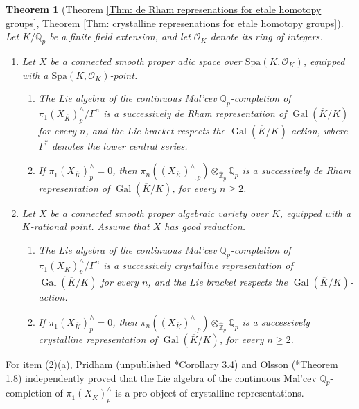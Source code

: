 \documentclass[11pt]{amsart}
\newtheorem{theorem}{Theorem}[section]
\theoremstyle{definition}
\numberwithin{equation}{section}
\numberwithin{equation}{section}
\newcommand\QQ{\mathbb{Q}}
\newcommand\ZZ{\mathbb{Z}}
\newcommand\OO{\mathcal{O}}
\DeclareMathOperator{\et}{\acute{e}t}
\DeclareMathOperator{\Gal}{Gal}
\begin{document}
\begin{theorem}[Theorem \ref{Thm: de Rham represenations for etale homotopy groups}, Theorem \ref{Thm: crystalline represenations for etale homotopy groups}]\label{Intro Thm: p-adic hodge}
Let $K/\QQ_p$ be a finite field extension, and let $\mathcal{O}_{K}$ denote its ring of integers.
\begin{enumerate}[leftmargin=0.25in]
    \item Let $X$ be a connected smooth proper adic space over $\mathrm{Spa}(K,\OO_K)$, equipped with a $\mathrm{Spa}(K,\OO_K)$-point. 
    \begin{enumerate}[leftmargin=0.27in]
        \item The Lie algebra of the continuous Mal'cev $\QQ_p$-completion of $\pi^{\et}_1(X_{\overline{K}})^{\wedge}_{p}/\Gamma^n$ is a successively de Rham representation of $\Gal(\overline{K}/K)$ for every $n$, and the Lie bracket respects the $\Gal(\overline{K}/K)$-action, where $\Gamma^*$ denotes the lower central series.
    \item If $\pi^{\et}_1(X_{\overline{K}})^{\wedge}_{p}=0$, then $\pi_n((X_{\overline{K}})^{\wedge}_{\et,p})\otimes_{\widehat{\ZZ}_{p}}\QQ_{p}$ is a successively de Rham representation of $\Gal(\overline{K}/K)$, for every $n\geq 2$.
    \end{enumerate}
    \item Let $X$ be a connected smooth proper algebraic variety over $K$, equipped with a $K$-rational point. Assume that $X$ has good reduction.
    \begin{enumerate}[leftmargin=0.27in]
        \item The Lie algebra of the continuous Mal'cev $\QQ_p$-completion of $\pi^{\et}_1(X_{\overline{K}})^{\wedge}_{p}/\Gamma^n$ is a successively crystalline representation of $\Gal(\overline{K}/K)$ for every $n$, and the Lie bracket respects the $\Gal(\overline{K}/K)$-action.
    \item If $\pi^{\et}_1(X_{\overline{K}})^{\wedge}_{p}=0$, then $\pi_n((X_{\overline{K}})^{\wedge}_{\et,p})\otimes_{\widehat{\ZZ}_{p}}\QQ_{p}$ is a successively crystalline representation of $\Gal(\overline{K}/K)$, for every $n\geq 2$.
    \end{enumerate}
\end{enumerate}
\end{theorem}

For item (2)(a), Pridham (unpublished \cite{Pridham-arxiv-galois-actions-pro-l-unipotent-fundamental}*{Corollary 3.4}) and Olsson (\cite{Olsson-p-adic-hodge}*{Theorem 1.8}) independently proved that the Lie algebra of the continuous Mal'cev $\QQ_p$-completion of $\pi^{\et}_1(X_{\overline{K}})^{\wedge}_{p}$ is a pro-object of crystalline representations.
\end{document}
